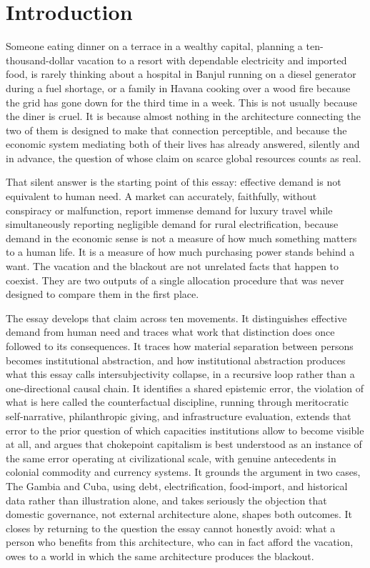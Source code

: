 \documentclass[11pt]{article}
\begin{document}
\newpage

\onehalfspacing

\section{Introduction}

Someone eating dinner on a terrace in a wealthy capital, planning a ten-thousand-dollar vacation to a resort with dependable electricity and imported food, is rarely thinking about a hospital in Banjul running on a diesel generator during a fuel shortage, or a family in Havana cooking over a wood fire because the grid has gone down for the third time in a week. This is not usually because the diner is cruel. It is because almost nothing in the architecture connecting the two of them is designed to make that connection perceptible, and because the economic system mediating both of their lives has already answered, silently and in advance, the question of whose claim on scarce global resources counts as real.

That silent answer is the starting point of this essay: effective demand is not equivalent to human need. A market can accurately, faithfully, without conspiracy or malfunction, report immense demand for luxury travel while simultaneously reporting negligible demand for rural electrification, because demand in the economic sense is not a measure of how much something matters to a human life. It is a measure of how much purchasing power stands behind a want. The vacation and the blackout are not unrelated facts that happen to coexist. They are two outputs of a single allocation procedure that was never designed to compare them in the first place.

The essay develops that claim across ten movements. It distinguishes effective demand from human need and traces what work that distinction does once followed to its consequences. It traces how material separation between persons becomes institutional abstraction, and how institutional abstraction produces what this essay calls intersubjectivity collapse, in a recursive loop rather than a one-directional causal chain. It identifies a shared epistemic error, the violation of what is here called the counterfactual discipline, running through meritocratic self-narrative, philanthropic giving, and infrastructure evaluation, extends that error to the prior question of which capacities institutions allow to become visible at all, and argues that chokepoint capitalism is best understood as an instance of the same error operating at civilizational scale, with genuine antecedents in colonial commodity and currency systems. It grounds the argument in two cases, The Gambia and Cuba, using debt, electrification, food-import, and historical data rather than illustration alone, and takes seriously the objection that domestic governance, not external architecture alone, shapes both outcomes. It closes by returning to the question the essay cannot honestly avoid: what a person who benefits from this architecture, who can in fact afford the vacation, owes to a world in which the same architecture produces the blackout.
\end{document}

